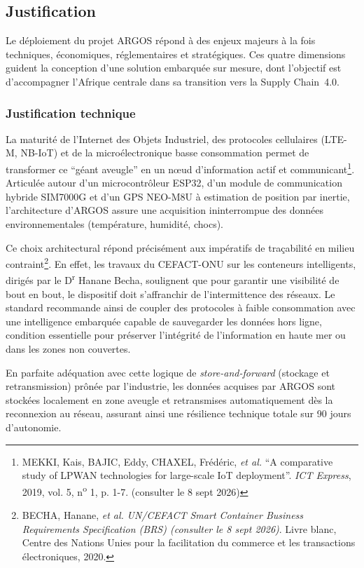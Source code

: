 \subsection{Justification}

Le déploiement du projet ARGOS répond à des enjeux majeurs à la fois techniques, économiques, réglementaires et stratégiques. Ces quatre dimensions guident la conception d'une solution embarquée sur mesure, dont l'objectif est d'accompagner l'Afrique centrale dans sa transition vers la Supply Chain~4.0.

\subsubsection*{Justification technique}
La maturité de l’Internet des Objets Industriel, des protocoles cellulaires (LTE-M, NB-IoT) et de la microélectronique basse consommation permet de transformer ce \enquote{géant aveugle} en un nœud d’information actif et communicant\footnote{MEKKI, Kais, BAJIC, Eddy, CHAXEL, Frédéric, \textit{et al.} \enquote{A comparative study of LPWAN technologies for large-scale IoT deployment}. \textit{ICT Express}, 2019, vol. 5, n\textsuperscript{o} 1, p. 1-7. (consulter le 8 sept 2026)}. Articulée autour d’un microcontrôleur ESP32, d’un module de communication hybride SIM7000G et d’un GPS NEO-M8U à estimation de position par inertie, l’architecture d’ARGOS assure une acquisition ininterrompue des données environnementales (température, humidité, chocs). 

Ce choix architectural répond précisément aux impératifs de traçabilité en milieu contraint\footnote{BECHA, Hanane, \textit{et al.} \textit{UN/CEFACT Smart Container Business Requirements Specification (BRS) (consulter le 8 sept 2026)}. Livre blanc, Centre des Nations Unies pour la facilitation du commerce et les transactions électroniques, 2020.}. En effet, les travaux du CEFACT-ONU sur les conteneurs intelligents, dirigés par le D\textsuperscript{r} Hanane Becha, soulignent que pour garantir une visibilité de bout en bout, le dispositif doit s'affranchir de l'intermittence des réseaux. Le standard recommande ainsi de coupler des protocoles à faible consommation avec une intelligence embarquée capable de sauvegarder les données hors ligne, condition essentielle pour préserver l'intégrité de l'information en haute mer ou dans les zones non couvertes.

En parfaite adéquation avec cette logique de \textit{store-and-forward} (stockage et retransmission) prônée par l'industrie, les données acquises par ARGOS sont stockées localement en zone aveugle et retransmises automatiquement dès la reconnexion au réseau, assurant ainsi une résilience technique totale sur 90 jours d’autonomie.


